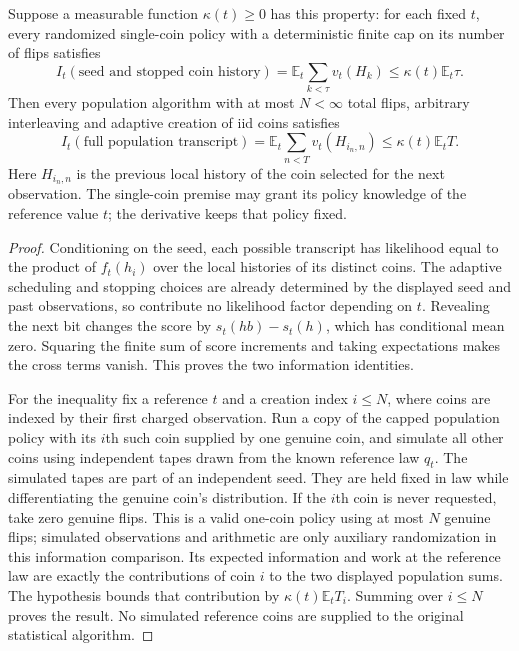 \begin{lemma}
\label{pop:direct-sum}
Suppose a measurable function $\kappa(t)\ge0$ has this property: for
each fixed $t$, every randomized single-coin policy with a deterministic
finite cap on its number of flips satisfies
\[
 I_t(\text{seed and stopped coin history})
 =\mathbb E_t\sum_{k<\tau}v_t(H_k)
 \le\kappa(t)\mathbb E_t\tau.
\]
Then every population algorithm with at most $N<\infty$ total flips,
arbitrary interleaving and adaptive creation of iid coins satisfies
\[
 I_t(\text{full population transcript})
 =\mathbb E_t\sum_{n<T}v_t(H_{i_n,n})
 \le\kappa(t)\mathbb E_tT.
\]
Here $H_{i_n,n}$ is the previous local history of the coin selected for
the next observation. The single-coin premise may grant its policy knowledge
of the reference value $t$; the derivative keeps that policy fixed.
\end{lemma}
\begin{proof}
Conditioning on the seed, each possible transcript has likelihood equal to
the product of $f_t(h_i)$ over the local histories of its distinct coins.
The adaptive scheduling and stopping choices are already determined by
the displayed seed and past observations, so contribute no likelihood
factor depending on $t$. Revealing the next bit changes the score by
$s_t(hb)-s_t(h)$, which has conditional mean zero. Squaring the finite
sum of score increments and taking expectations makes the cross terms
vanish. This proves the two information identities.

For the inequality fix a reference $t$ and a creation index $i\le N$,
where coins are indexed by their first charged observation. Run a copy of
the capped population policy with its $i$th such coin supplied by one
genuine coin, and simulate all other coins using independent tapes drawn
from the known reference law $q_t$. The simulated tapes are part of an
independent seed. They are held fixed in law while differentiating the
genuine coin's distribution. If the $i$th coin is never requested, take
zero genuine flips. This is a valid one-coin policy using at most $N$
genuine flips; simulated observations and arithmetic are only auxiliary
randomization in this information comparison. Its expected information
and work at the reference law are exactly the contributions of coin $i$
to the two displayed population sums. The hypothesis bounds that
contribution by $\kappa(t)\mathbb E_t T_i$. Summing over $i\le N$
proves the result. No simulated reference coins are supplied to the
original statistical algorithm.
\end{proof}

